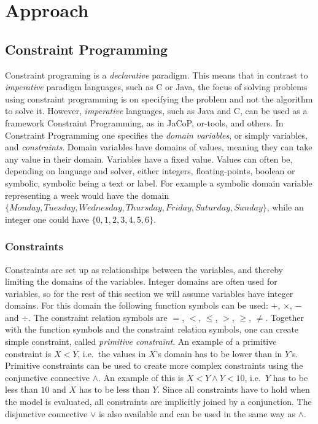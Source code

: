 \chapter{Approach}\label{cha:approach}

\section{Constraint Programming}
Constraint programing is a \emph{declarative} paradigm. This means that in contrast to \emph{imperative} paradigm languages, such as C or Java, the focus of solving problems using constraint programming is on specifying the problem and not the algorithm to solve it. However, \emph{imperative} languages, such as Java and C, can be used as a framework Constraint Programming, as in JaCoP, or-tools, and others. In Constraint Programming one specifies the \emph{domain variables}, or simply variables, and \emph{constraints}. Domain variables have domains of values, meaning they can take any value in their domain. Variables have a fixed value. Values can often be, depending on language and solver, either integers, floating-points, boolean or symbolic, symbolic being a text or label. For example a symbolic domain variable representing a week would have the domain\\
$\{Monday,Tuesday, Wednesday, Thursday, Friday, Saturday, Sunday\}$, while an integer one could have $\{0,1,2,3,4,5,6\}$.

\subsection{Constraints}
Constraints are set up as relationships between the variables, and thereby limiting the domains of the variables. Integer domains are often used for variables, so for the rest of this section we will assume variables have integer domains. For this domain the following function symbols can be used: $+$, $\times$, $-$ and $\div$. The constraint relation symbols are $=$, $<$, $\leq$, $>$, $\geq$, $\neq$. Together with the function symbols and the constraint relation symbols, one can create simple constraint, called \emph{primitive constraint}. An example of a primitive constraint is $X < Y$, i.e.\ the values in $X$'s domain has to be lower than in $Y$'s. Primitive constraints can be used to create more complex constraints using the conjunctive connective $\land$. An example of this is $X < Y \land Y < 10$, i.e.\ $Y$ has to be less than $10$ and $X$ has to be less than $Y$. Since all constraints have to hold when the model is evaluated, all constraints are implicitly joined by a conjunction. The disjunctive connective $\lor$ is also available and can be used in the same way as $\land$. 

